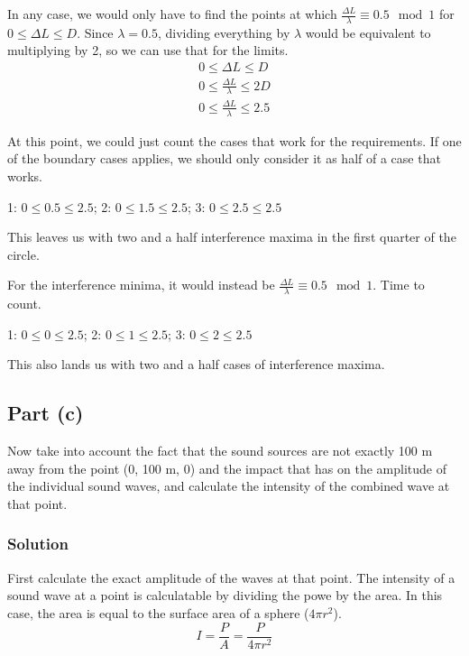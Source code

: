 \documentclass[12pt]{article}
\begin{document}
            In any case, we would only have to find the points at which $\frac{\Delta L}{\lambda} \equiv 0.5 \mod 1$ for $0 \leq \Delta L \leq D$.
            Since $\lambda = 0.5$, dividing everything by $\lambda$ would be equivalent to multiplying by 2, so we can use that for the limits.
            \begin{gather}
                0 \leq \Delta L \leq D\\
                0 \leq \frac{\Delta L}{\lambda} \leq 2D\\
                0 \leq \frac{\Delta L}{\lambda} \leq 2.5
            \end{gather}

            At this point, we could just count the cases that work for the requirements.
            If one of the boundary cases applies, we should only consider it as half of a case that works.
            \begin{center}
                1: $0 \leq 0.5 \leq 2.5$;
                2: $0 \leq 1.5 \leq 2.5$;
                3: $0 \leq 2.5 \leq 2.5$
            \end{center}
            This leaves us with two and a half interference maxima in the first quarter of the circle.

            For the interference minima, it would instead be $\frac{\Delta L}{\lambda} \equiv 0.5 \mod 1$.
            Time to count.
            \begin{center}
                1: $0 \leq 0 \leq 2.5$;
                2: $0 \leq 1 \leq 2.5$;
                3: $0 \leq 2 \leq 2.5$
            \end{center}

            This also lands us with two and a half cases of interference maxima.

        \subsection{Part (c)}
            Now take into account the fact that the sound sources are not exactly 100 m away from the point (0, 100 m, 0) and the impact that has on the amplitude of the individual sound waves, and calculate the intensity of the combined wave at that point.

            \subsubsection{Solution}
                First calculate the exact amplitude of the waves at that point.
                The intensity of a sound wave at a point is calculatable by dividing the powe by the area.
                In this case, the area is equal to the surface area of a sphere ($4\pi r^2$).
                \begin{equation}
                    I = \frac{P}{A} = \frac{P}{4\pi r^2}
                \end{equation}
\end{document}
